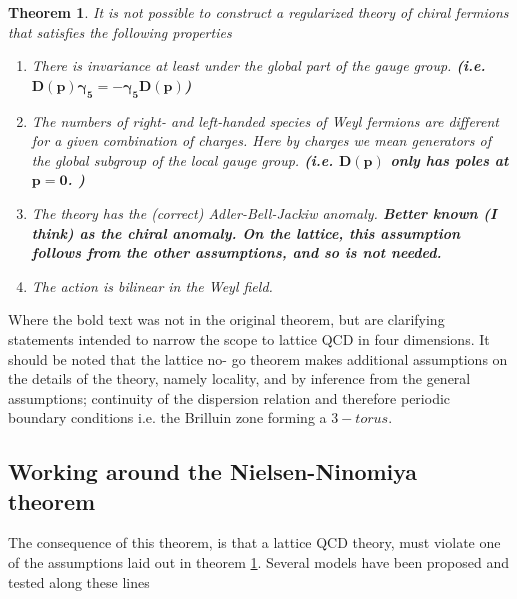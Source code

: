 \documentclass[a4paper,10pt]{book}
\newtheorem{theorem}{Theorem}
\begin{document}
\begin{theorem}\label{theorem:asas}
It is not possible to construct a regularized theory of chiral fermions that satisfies the following properties
\begin{enumerate}
\item There is invariance at least under the global
part of the gauge group. \textbf{(i.e. $\mathbf{D(p)\gamma_5 = -\gamma_5D(p)}$)}
\item The numbers of right- and left-handed species
of Weyl fermions are different for a given combination of charges. Here by charges we mean generators of the global subgroup of the local gauge group. \textbf{(i.e. $\mathbf{D(p)}$ only has poles at $\mathbf{p=0}$. )}
\item The theory has the (correct) Adler-Bell-Jackiw
anomaly. \textbf{Better known (I think) as the chiral anomaly. On the lattice, this assumption follows from the other assumptions, and so is not needed.}
\item The action is bilinear in the Weyl field. 

\end{enumerate}
\end{theorem}
Where the bold text was not in the original theorem, but are clarifying statements intended to narrow the scope to lattice QCD in four dimensions. It should be noted that the lattice no- go theorem makes additional assumptions on the details of the theory, namely locality, and by inference from the general assumptions; continuity of the dispersion relation and therefore periodic boundary conditions i.e. the Brilluin zone forming a $3- torus$\cite{NielsenH.B1981Antf}.
\subsection{Working around the Nielsen-Ninomiya theorem}\label{Chiral_fermions}
The  consequence of this theorem, is that a lattice QCD theory, must violate one of the assumptions laid out in theorem \ref{theorem:asas}. Several models have been proposed and tested along these lines
\end{document}
